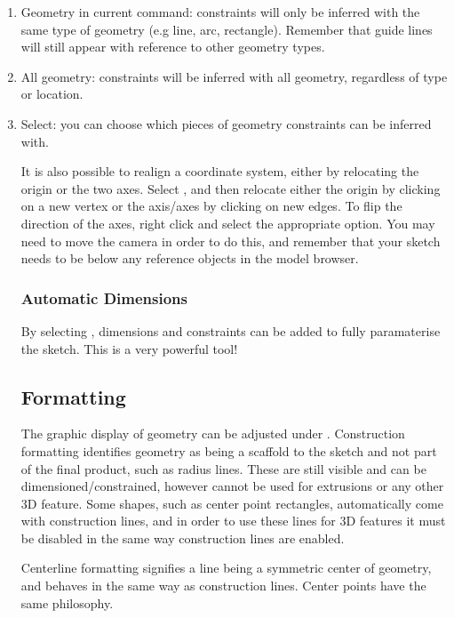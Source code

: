 \begin{enumerate}
    \item Geometry in current command: constraints will only be inferred with the same type of geometry (e.g line, arc, rectangle). Remember that guide lines will still appear with reference to other geometry types.
    \item All geometry: constraints will be inferred with all geometry, regardless of type or location.
    \item Select: you can choose which pieces of geometry constraints can be inferred with.

It is also possible to realign a coordinate system, either by relocating the origin or the two axes. Select , and then relocate either the origin by clicking on a new vertex or the axis/axes by clicking on new edges. To flip the direction of the axes, right click and select the appropriate option. You may need to move the camera in order to do this, and remember that your sketch needs to be below any reference objects in the model browser. 


\subsubsection{Automatic Dimensions}
By selecting , dimensions and constraints can be added to fully paramaterise the sketch. This is a very powerful tool!

\subsection{Formatting}

The graphic display of geometry can be adjusted under . Construction formatting identifies geometry as being a scaffold to the sketch and not part of the final product, such as radius lines. These are still visible and can be dimensioned/constrained, however cannot be used for extrusions or any other 3D feature. Some shapes, such as center point rectangles, automatically come with construction lines, and in order to use these lines for 3D features it must be disabled in the same way construction lines are enabled.

Centerline formatting signifies a line being a symmetric center of geometry, and behaves in the same way as construction lines. Center points have the same philosophy.


\end{enumerate}
